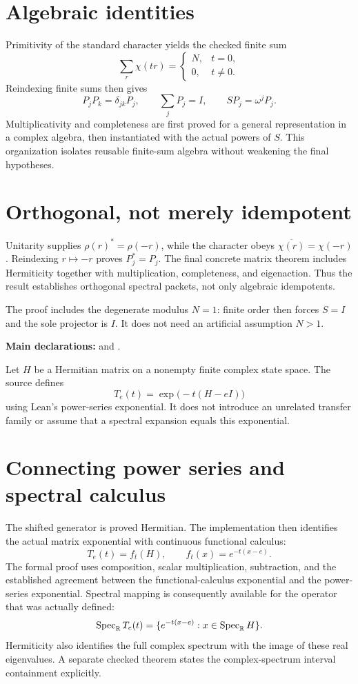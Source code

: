 \documentclass[10pt,letterpaper]{article}
\newcommand{\Spec}{\operatorname{Spec}}\newcommand{\Ran}{\operatorname{Ran}}
\newcommand{\pageheading}[2]{\vspace*{2pt}{\small\color{ink}\textsc{#1}}\par\vspace{2pt}{\Large\bfseries #2}\par\vspace{4pt}}
\begin{document}
\section*{Algebraic identities}
Primitivity of the standard character yields the checked finite sum
\[
\sum_r\chi(tr)=\begin{cases}N,&t=0,\\0,&t\ne0.\end{cases}
\]
Reindexing finite sums then gives
\[
\boxed{P_jP_k=\delta_{jk}P_j,\qquad \sum_jP_j=I,\qquad SP_j=\omega^jP_j.}
\]
Multiplicativity and completeness are first proved for a general representation in a complex algebra, then instantiated with the actual powers of $S$. This organization isolates reusable finite-sum algebra without weakening the final hypotheses.

\section*{Orthogonal, not merely idempotent}
Unitarity supplies $\rho(r)^*=\rho(-r)$, while the character obeys $\overline{\chi(r)}=\chi(-r)$. Reindexing $r\mapsto-r$ proves $P_j^*=P_j$. The final concrete matrix theorem includes Hermiticity together with multiplication, completeness, and eigenaction. Thus the result establishes orthogonal spectral packets, not only algebraic idempotents.

The proof includes the degenerate modulus $N=1$: finite order then forces $S=I$ and the sole projector is $I$. It does not need an artificial assumption $N>1$.

\textbf{Main declarations:}  and .

\newpage
\pageheading{Theorem 10.1}{The actual Euclidean transfer exponential}
Let $H$ be a Hermitian matrix on a nonempty finite complex state space. The source defines
\[
T_e(t)=\exp\bigl(-t(H-eI)\bigr)
\]
using Lean's power-series exponential. It does not introduce an unrelated transfer family or assume that a spectral expansion equals this exponential.

\section*{Connecting power series and spectral calculus}
The shifted generator is proved Hermitian. The implementation then identifies the actual matrix exponential with continuous functional calculus:
\[
\boxed{T_e(t)=f_t(H),\qquad f_t(x)=e^{-t(x-e)}.}
\]
The formal proof uses composition, scalar multiplication, subtraction, and the established agreement between the functional-calculus exponential and the power-series exponential. Spectral mapping is consequently available for the operator that was actually defined:
\[
\Spec_\R T_e(t)=\{e^{-t(x-e)}:x\in\Spec_\R H\}.
\]
Hermiticity also identifies the full complex spectrum with the image of these real eigenvalues. A separate checked theorem states the complex-spectrum interval containment explicitly.
\end{document}
